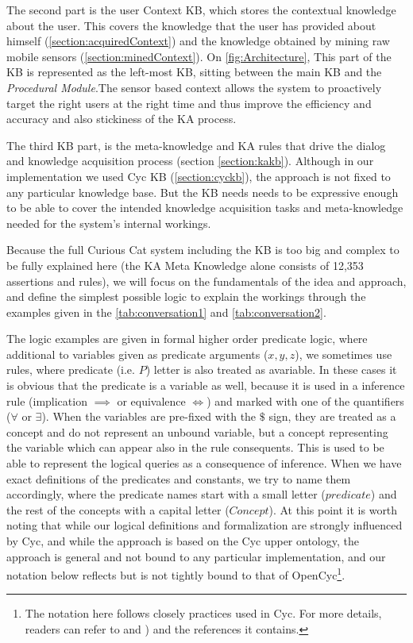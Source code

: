 The second part is the user Context KB, which stores the contextual knowledge 
about the user. This covers the knowledge that the user has provided about 
himself (\autoref{section:acquiredContext}) and the knowledge obtained by 
mining raw mobile sensors (\autoref{section:minedContext}). On 
\autoref{fig:Architecture}, This part of the KB is represented 
as the left-most KB, sitting between the main KB and the 
\emph{Procedural Module}.The sensor based context allows the system to 
proactively target the right users at the right time and thus improve the 
efficiency and accuracy and also stickiness of the KA process.

The third KB part, is the meta-knowledge and KA rules that drive the dialog and 
knowledge acquisition process (section \ref{section:kakb}). Although in our 
implementation we 
used Cyc KB (\autoref{section:cyckb}), the approach is not 
fixed to any particular knowledge base. But the KB needs needs to be expressive
enough to be able to cover the intended knowledge acquisition tasks and 
meta-knowledge needed for the system's internal workings. 

Because the full Curious Cat system including the KB is too big and complex to 
be fully explained here (the KA Meta Knowledge alone consists of 12,353 
assertions and rules), we will focus on the fundamentals of the idea and 
approach, and define the simplest possible logic to explain the workings 
through the examples given in the \autoref{tab:conversation1} and 
\autoref{tab:conversation2}. 

The logic examples are given in formal higher order predicate logic, where
additional to variables given as predicate arguments ($x, y, z$), we sometimes
use rules, where predicate (i.e. $P$) letter is also treated as avariable. 
In these cases it is
obvious that the predicate is a variable as well, because it is used in a
inference rule (implication $\implies$ or equivalence $\iff$) and marked with
one of the quantifiers ($\forall$ or $\exists$). When the variables are
pre-fixed with the $\$$ sign, they are treated as a concept and do not
represent an unbound variable, but a concept representing the variable which
can appear also in the rule consequents. This is used to be able to represent
the logical queries as a consequence of inference.
When we have exact definitions of the predicates and constants, we try to name
them accordingly, where the predicate names start with a small letter 
($predicate$) and the rest of the 
concepts with a capital letter ($Concept$). At this point it is worth noting 
that while our logical definitions and formalization are strongly influenced by 
Cyc\parencite{Lenat1995}, and while the approach is based on the Cyc upper 
ontology, the approach is general and not bound to any particular 
implementation, and our notation below reflects but is not tightly bound to 
that of OpenCyc\footnote{The notation here follows closely practices used in 
Cyc. For more details, readers can refer to \parencite{Lenat1995} and
\parencite{Matuszek2006}) and the references it contains.}. 

